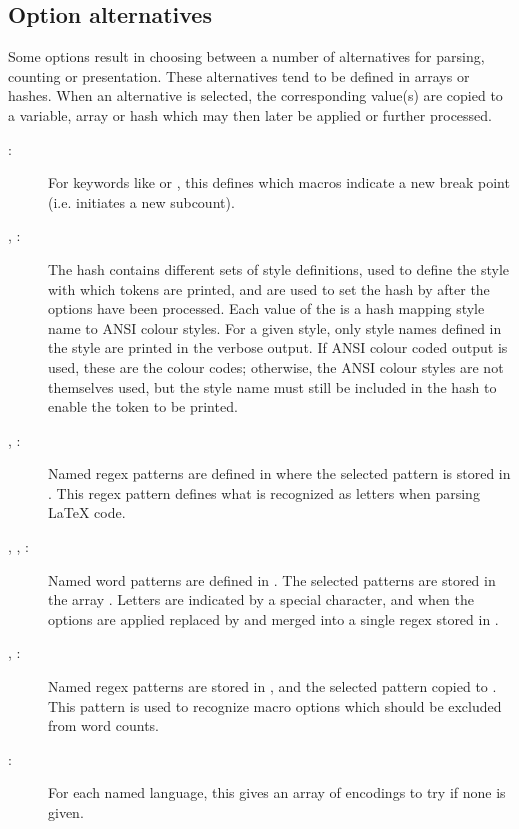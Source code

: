 \documentclass{article}
\begin{document}
\subsection{Option alternatives}

Some options result in choosing between a number of alternatives for parsing, counting or presentation. These alternatives tend to be defined in arrays or hashes. When an alternative is selected, the corresponding value(s) are copied to a variable, array or hash which may then later be applied or further processed.

\begin{description}

\item[:] For keywords like  or , this defines which macros indicate a new break point (i.e. initiates a new subcount).

\item[, :] The  hash contains different sets of style definitions, used to define the style with which tokens are printed, and are used to set the  hash by  after the options have been processed. Each value of the  is a hash mapping style name to ANSI colour styles. For a given style, only style names defined in the style are printed in the verbose output. If ANSI colour coded output is used, these are the colour codes; otherwise, the ANSI colour styles are not themselves used, but the style name must still be included in the hash to enable the token to be printed.

\item[, :] Named regex patterns are defined in  where the selected pattern is stored in . This regex pattern defines what is recognized as letters when parsing \LaTeX{} code.

\item[, , :] Named word patterns are defined in . The selected patterns are stored in the array . Letters are indicated by a special character, and when the options are applied replaced by  and merged into a single regex stored in .

\item[, :] Named regex patterns are stored in , and the selected pattern copied to . This pattern is used to recognize macro options which should be excluded from word counts.

\item[:] For each named language, this gives an array of encodings to try if none is given.

\end{description}
\end{document}
